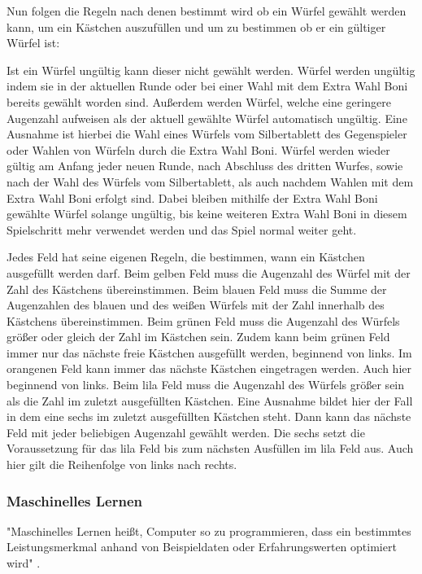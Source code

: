 Nun folgen die Regeln nach denen bestimmt wird ob ein Würfel gewählt werden kann, um ein Kästchen auszufüllen und um zu bestimmen ob er ein gültiger Würfel ist:

Ist ein Würfel ungültig kann dieser nicht gewählt werden. Würfel werden ungültig indem sie in der aktuellen Runde oder bei einer Wahl mit dem Extra Wahl Boni bereits gewählt worden sind. Außerdem werden Würfel, welche eine geringere Augenzahl aufweisen als der aktuell gewählte Würfel automatisch ungültig. Eine Ausnahme ist hierbei die Wahl eines Würfels vom Silbertablett des Gegenspieler oder Wahlen von Würfeln durch die Extra Wahl Boni. Würfel werden wieder gültig am Anfang jeder neuen Runde, nach Abschluss des dritten Wurfes, sowie nach der Wahl des Würfels vom Silbertablett, als auch nachdem Wahlen mit dem Extra Wahl Boni erfolgt sind. Dabei bleiben mithilfe der Extra Wahl Boni gewählte Würfel solange ungültig, bis keine weiteren Extra Wahl Boni in diesem Spielschritt mehr verwendet werden und das Spiel normal weiter geht.

Jedes Feld hat seine eigenen Regeln, die bestimmen, wann ein Kästchen ausgefüllt werden darf. Beim gelben Feld muss die Augenzahl des Würfel mit der Zahl des Kästchens übereinstimmen. Beim blauen Feld muss die Summe der Augenzahlen des blauen und des weißen Würfels mit der Zahl innerhalb des Kästchens übereinstimmen. Beim grünen Feld muss die Augenzahl des Würfels größer oder gleich der Zahl im Kästchen sein. Zudem kann beim grünen Feld immer nur das nächste freie Kästchen ausgefüllt werden, beginnend von links. Im orangenen Feld kann immer das nächste Kästchen eingetragen werden. Auch hier beginnend von links. Beim lila Feld muss die Augenzahl des Würfels größer sein als die Zahl im zuletzt ausgefüllten Kästchen. Eine Ausnahme bildet hier der Fall in dem eine sechs im zuletzt ausgefüllten Kästchen steht. Dann kann das nächste Feld mit jeder beliebigen Augenzahl gewählt werden. Die sechs setzt die Voraussetzung für das lila Feld bis zum nächsten Ausfüllen im lila Feld aus. Auch hier gilt die Reihenfolge von links nach rechts.
\subsubsection{Maschinelles Lernen}
"Maschinelles Lernen heißt, Computer so zu programmieren, dass ein bestimmtes Leistungsmerkmal anhand von Beispieldaten oder Erfahrungswerten optimiert wird" \cite[Seite 3]{alpaydin_maschinelles_2022}.

